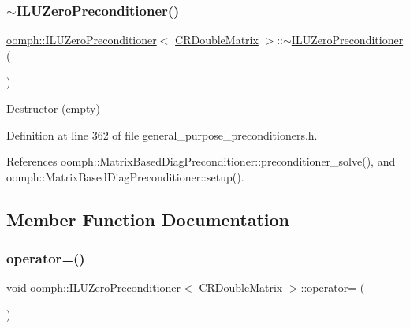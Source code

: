 \subsubsection{\texorpdfstring{$\sim$\+I\+L\+U\+Zero\+Preconditioner()}{~ILUZeroPreconditioner()}}
{\footnotesize\ttfamily \hyperlink{classoomph_1_1ILUZeroPreconditioner}{oomph\+::\+I\+L\+U\+Zero\+Preconditioner}$<$ \hyperlink{classoomph_1_1CRDoubleMatrix}{C\+R\+Double\+Matrix} $>$\+::$\sim$\hyperlink{classoomph_1_1ILUZeroPreconditioner}{I\+L\+U\+Zero\+Preconditioner} (\begin{DoxyParamCaption}{ }\end{DoxyParamCaption})\hspace{0.3cm}{\ttfamily [inline]}}



Destructor (empty) 



Definition at line 362 of file general\+\_\+purpose\+\_\+preconditioners.\+h.



References oomph\+::\+Matrix\+Based\+Diag\+Preconditioner\+::preconditioner\+\_\+solve(), and oomph\+::\+Matrix\+Based\+Diag\+Preconditioner\+::setup().



\subsection{Member Function Documentation}
\mbox{\label{classoomph_1_1ILUZeroPreconditioner_3_01CRDoubleMatrix_01_4_a57381875090420fc4bfd28a5247dd898}} 
\subsubsection{\texorpdfstring{operator=()}{operator=()}}
{\footnotesize\ttfamily void \hyperlink{classoomph_1_1ILUZeroPreconditioner}{oomph\+::\+I\+L\+U\+Zero\+Preconditioner}$<$ \hyperlink{classoomph_1_1CRDoubleMatrix}{C\+R\+Double\+Matrix} $>$\+::operator= (\begin{DoxyParamCaption}\item[{const \hyperlink{classoomph_1_1ILUZeroPreconditioner}{I\+L\+U\+Zero\+Preconditioner}$<$ \hyperlink{classoomph_1_1CRDoubleMatrix}{C\+R\+Double\+Matrix} $>$ \&}]{ }\end{DoxyParamCaption})\hspace{0.3cm}{\ttfamily [inline]}}



